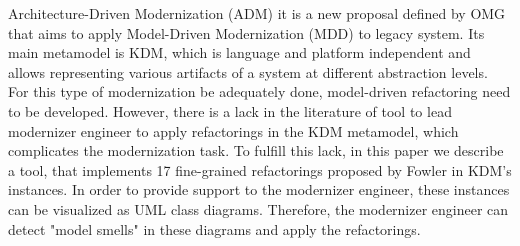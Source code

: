 



Architecture-Driven Modernization (ADM) it is a new proposal defined by OMG that aims to apply Model-Driven Modernization (MDD) to legacy system. Its main metamodel is KDM, which is language and platform independent and allows representing various artifacts of a system at different abstraction levels. For this type of modernization be adequately done, model-driven refactoring need to be developed. However, there is a lack in the literature of tool to lead modernizer engineer to apply refactorings in the KDM metamodel, which complicates the modernization task. To fulfill this lack, in this paper we describe a tool, that implements 17 fine-grained refactorings proposed by Fowler in KDM's instances. In order to provide support to the modernizer engineer, these instances can be visualized as UML class diagrams. Therefore, the modernizer engineer can detect 
"model smells" in these diagrams and apply the refactorings.








